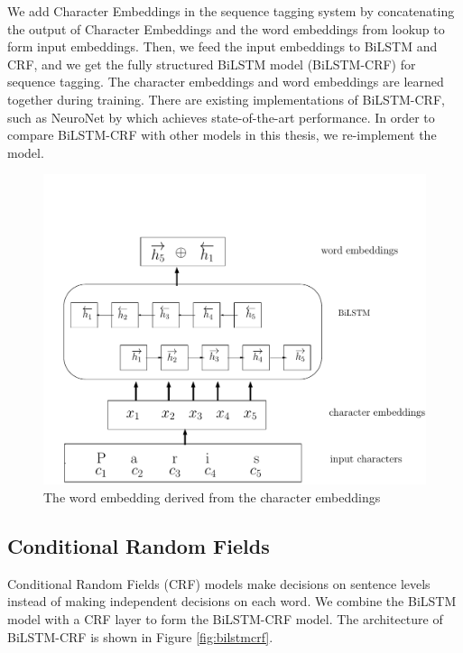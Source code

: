 We add Character Embeddings in the sequence tagging system by concatenating the output of Character Embeddings and the word embeddings from lookup to form input embeddings. Then, we feed the input embeddings to BiLSTM and CRF, and we get the fully structured BiLSTM model (BiLSTM-CRF) for sequence tagging. The character embeddings and word embeddings are learned together during training. There are existing implementations of BiLSTM-CRF, such as NeuroNet by \cite{2017neuroner} which achieves state-of-the-art performance. In order to compare BiLSTM-CRF with other models in this thesis, we re-implement the model.

\begin{figure}
  \centering
  \includegraphics[scale=0.6]{bilstmchar.pdf}
 \caption{The word embedding derived from the character embeddings}
  \label{fig:charlstm}
\end{figure}

\subsection{Conditional Random Fields}

Conditional Random Fields (CRF) models make decisions on sentence levels instead of making independent decisions on each word. We combine the BiLSTM model with a CRF layer to form the BiLSTM-CRF model. The architecture of BiLSTM-CRF is shown in Figure \ref{fig:bilstmcrf}. 

